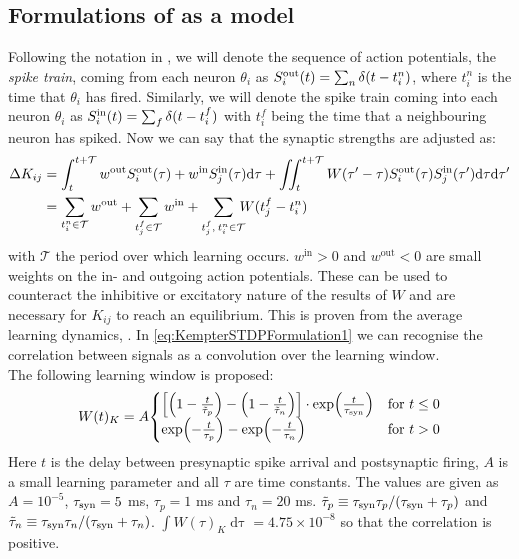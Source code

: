 \subsection{Formulations of \STDP as a model}
Following the notation in \cite{Kempter1999}, we will denote the sequence of action potentials, the \textsl{spike train}, coming from each neuron $\theta_i$ as $S_i^{\rm out}(t) = \sum_{n} \delta (t-t_{i}^{n})$, where $t_{i}^{n}$ is the time that $\theta_i$ has fired. Similarly, we will denote the spike train coming into each neuron $\theta_i$ as $S_i^{\rm in}(t) = \sum_{f} \delta (t-t_{i}^{f})$ with $t_{i}^{f}$ being the time that a neighbouring neuron has spiked. Now we can say that the synaptic strengths are adjusted as:
\begin{align}
\Delta K_{ij} &= \int_{t}^{t+\mathcal{T}} w^{\rm{out}} S_i^{\rm out}(\tau) + w^{\rm{in}} S_{j}^{\rm {in}}(\tau) \mathrm{d}\tau
+ \iint_{t}^{t+\mathcal{T}} W( \tau^\prime - \tau) S_{i}^{\rm out}(\tau) S_{j}^{\rm in}( \tau^\prime) \mathrm{d} \tau \mathrm{d} \tau^\prime
\label{eq:KempterSTDPFormulation1} \\
&= \sum_{t_i^{n}\in \mathcal{T}} w^{\mathrm{out}} + \sum_{t_{j}^{f} \in \mathcal{T}} w^{\mathrm{in}} + \sum_{t_{j}^{f}, \: t_i^{n} \in \mathcal{T}} \hspace{-2mm} W (t_{j}^{f}-t_i^{n} ) \label{eq:KempterSTDPFormulation2}
\end{align}
with $\mathcal{T}$ the period over which learning occurs. $w^{\mathrm{in}} > 0$ and $w^{\mathrm{out}} < 0$ are small weights on the in- and outgoing action potentials. These can be used to counteract the inhibitive or excitatory nature of the results of $W$ and are necessary for $K_{ij}$ to reach an equilibrium. This is proven from the average learning dynamics, \cite{Kempter1999}. In \eqref{eq:KempterSTDPFormulation1} we can recognise the correlation between signals as a convolution over the learning window. \\

The following learning window is proposed:
\begin{align}
W(t)_K = A
\begin{cases}
\left[\left(1-\frac{t}{\tilde{\tau}_{p}}\right) - \left(1-\frac{t}{\tilde{\tau}_{n}}\right)\right] \cdot \exp \left( \frac{t}{\tau_{\rm syn}} \right) & \text{for } t \leq 0 \\
 \exp \left(-\frac{t}{\tau_{p}}\right) - \exp \left(-\frac{t}{\tau_{n}} \right) & \text{for } t > 0
\end{cases} \label{eq:learningwindowKempter1999}
\end{align}
Here $t$ is the delay between presynaptic spike arrival and postsynaptic firing, $A$ is a small learning parameter and all $\tau$ are time constants. The values are given as $A = 10^{-5}$, $\tau_{\rm syn} = 5$ ms, $\tau_{p} = 1$ ms and $\tau_{n} = 20$ ms. $\tilde{\tau}_{p} \equiv \tau_{\rm syn} \tau_{p} / (\tau_{\rm syn} + \tau_{p})$ and $\tilde{\tau}_{n} \equiv \tau_{\rm syn} \tau_{n} / (\tau_{\rm syn} + \tau_{n})$. $\int W(\tau)_K \mathop{d \tau} = 4.75 \times 10^{-8}$ so that the correlation is positive. \\

